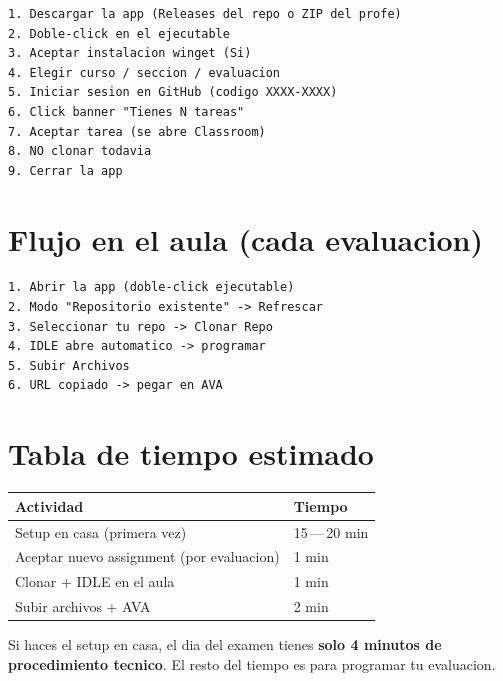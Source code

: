 \documentclass[11pt,a4paper,oneside]{report}
\begin{document}
\begin{lstlisting}
1. Descargar la app (Releases del repo o ZIP del profe)
2. Doble-click en el ejecutable
3. Aceptar instalacion winget (Si)
4. Elegir curso / seccion / evaluacion
5. Iniciar sesion en GitHub (codigo XXXX-XXXX)
6. Click banner "Tienes N tareas"
7. Aceptar tarea (se abre Classroom)
8. NO clonar todavia
9. Cerrar la app
\end{lstlisting}

\section{Flujo en el aula (cada evaluacion)}

\begin{lstlisting}
1. Abrir la app (doble-click ejecutable)
2. Modo "Repositorio existente" -> Refrescar
3. Seleccionar tu repo -> Clonar Repo
4. IDLE abre automatico -> programar
5. Subir Archivos
6. URL copiado -> pegar en AVA
\end{lstlisting}

\section{Tabla de tiempo estimado}

\begin{tabular}{l l}
\hline
\textbf{Actividad} & \textbf{Tiempo} \\
\hline
Setup en casa (primera vez)                & 15\,---\,20 min \\
Aceptar nuevo assignment (por evaluacion)  & 1 min \\
Clonar + IDLE en el aula                   & 1 min \\
Subir archivos + AVA                       & 2 min \\
\hline
\end{tabular}

\vspace{1cm}

\begin{successbox}[Recuerda]
Si haces el setup en casa, el dia del examen tienes \textbf{solo 4 minutos de procedimiento tecnico}. El resto del tiempo es para programar tu evaluacion.
\end{successbox}
\end{document}
